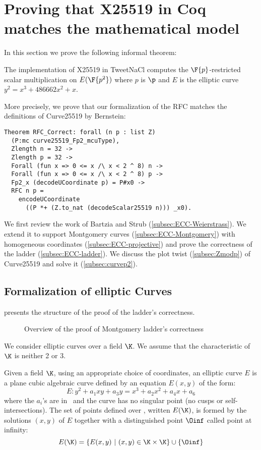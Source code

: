 \section{Proving that X25519 in Coq matches the mathematical model}
\label{sec:maths}

In this section we prove the following informal theorem:

\begin{informaltheorem}
The implementation of X25519 in TweetNaCl computes the
$\F{p}$-restricted \xcoord scalar multiplication on $E(\F{p^2})$ where $p$ is $\p$
and $E$ is the elliptic curve $y^2 = x^3 + 486662 x^2 + x$.
\end{informaltheorem}

More precisely, we prove that our formalization of the RFC matches the definitions of Curve25519 by Bernstein:
\begin{lstlisting}[language=Coq]
Theorem RFC_Correct: forall (n p : list Z)
  (P:mc curve25519_Fp2_mcuType),
  Zlength n = 32 ->
  Zlength p = 32 ->
  Forall (fun x => 0 <= x /\ x < 2 ^ 8) n ->
  Forall (fun x => 0 <= x /\ x < 2 ^ 8) p ->
  Fp2_x (decodeUCoordinate p) = P#x0 ->
  RFC n p =
    encodeUCoordinate
      ((P *+ (Z.to_nat (decodeScalar25519 n))) _x0).
\end{lstlisting}

We first review the work of Bartzia and Strub \cite{BartziaS14} (\ref{subsec:ECC-Weierstrass}).
We extend it to support Montgomery curves (\ref{subsec:ECC-Montgomery})
with homogeneous coordinates (\ref{subsec:ECC-projective}) and prove the
correctness of the ladder (\ref{subsec:ECC-ladder}).
We discuss the plot twist (\ref{subsec:Zmodp}) of Curve25519 and solve it (\ref{subsec:curvep2}).

\subsection{Formalization of elliptic Curves}
\label{subsec:ECC}

 presents the structure of the proof of the ladder's
correctness.
\begin{figure}[h]
  \centering
  
  \caption{Overview of the proof of Montgomery ladder's correctness}
  \label{tikz:ProofHighLevel1}
\end{figure}

We consider elliptic curves over a field $\K$. We assume that the
characteristic of $\K$ is neither 2 or 3.

\begin{dfn}
Given a field $\K$,
using an appropriate choice of coordinates,
an elliptic curve $E$
is a plane cubic algebraic curve defined by an equation $E(x,y)$ of the form:
$$E : y^2 + a_1 xy + a_3 y = x^3 + a_2 x^2 + a_4 x + a_6$$
where the $a_i$'s are in \K\ and the curve has no singular point (\ie no cusps
or self-intersections). The set of points defined over \K, written $E(\K)$, is formed by the
solutions $(x,y)$ of $E$ together with a distinguished point $\Oinf$ called point at infinity:
$$E(\K) = \{ E(x,y)~|~(x,y) \in \K \times \K\} \cup \{\Oinf\}$$
\end{dfn}


